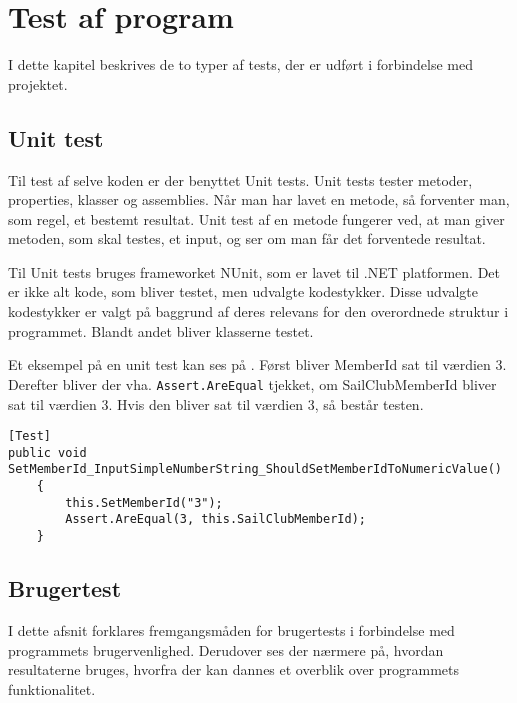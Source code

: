 \chapter{Test af program}\label{test_af_program}
I dette kapitel beskrives de to typer af tests, der er udført i forbindelse med projektet. 

\section{Unit test}
Til test af selve koden er der benyttet Unit tests.
Unit tests tester metoder, properties, klasser og assemblies. 
Når man har lavet en metode, så forventer man, som regel, et bestemt resultat. 
Unit test af en metode fungerer ved, at man giver metoden, som skal testes, et input, og ser om man får det forventede resultat.

Til Unit tests bruges frameworket NUnit, som er lavet til .NET platformen. 
Det er ikke alt kode, som bliver testet, men udvalgte kodestykker.
Disse udvalgte kodestykker er valgt på baggrund af deres relevans for den overordnede struktur i programmet. 
Blandt andet bliver klasserne testet. 

Et eksempel på en unit test kan ses på .
Først bliver MemberId sat til værdien 3. 
Derefter bliver der vha. \texttt{Assert.AreEqual} tjekket, om SailClubMemberId bliver sat til værdien 3.
Hvis den bliver sat til værdien 3, så består testen.

\begin{lstlisting}[frame=single, caption=Eksempel på Unit test, label=unit_test]
[Test]
public void SetMemberId_InputSimpleNumberString_ShouldSetMemberIdToNumericValue()
	{
		this.SetMemberId("3");
		Assert.AreEqual(3, this.SailClubMemberId);
	}
\end{lstlisting}

\section{Brugertest}
I dette afsnit forklares fremgangsmåden for brugertests i forbindelse med programmets brugervenlighed.
Derudover ses der nærmere på, hvordan resultaterne bruges, hvorfra der kan dannes et overblik over programmets funktionalitet. 

